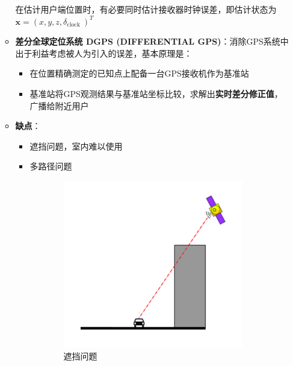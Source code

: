 \documentclass[../main.tex]{subfiles}
\begin{document}
\begin{enumerate}
\begin{itemize}
{在估计用户端位置时，有必要同时估计接收器时钟误差，即估计状态为\( \mathbf{x} = {\left( x,y,z,{\delta }_{\text{clock }}\right) }^{T} \)}
        \item \textbf{差分全球定位系统 DGPS (DIFFERENTIAL GPS)}：消除GPS系统中出于利益考虑被人为引入的误差，基本原理是：
            \begin{itemize}
                \item 在位置精确测定的已知点上配备一台GPS接收机作为基准站
                \item 基准站将GPS观测结果与基准站坐标比较，求解出\textbf{实时差分修正值}，广播给附近用户
            \end{itemize}
        \item \textbf{缺点}：
        \begin{itemize}
            \item 遮挡问题，室内难以使用
            \item 多路径问题
        \end{itemize}
        \begin{figure}[H]
    \centering
        \begin{subfigure}[b]{0.35\textwidth}
            \centering
            \includegraphics[width=\textwidth]{images/hide.png}
            \caption{遮挡问题}
            \label{fig:hide}
        \end{subfigure}
        \begin{subfigure}[b]{0.48\textwidth}

\end{subfigure}
\end{figure}
\end{itemize}
\end{enumerate}
\end{document}
